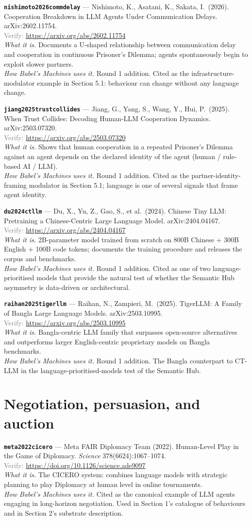 \documentclass[11pt,a4paper]{article}
\newcommand{\entry}[5]{%
  \par\smallskip
  \noindent\textbf{\texttt{#1}} --- #2\\
  {\footnotesize \textcolor{gray}{Verify:} \url{#3}}\\
  \textit{What it is.} #4\\
  \textit{How Babel's Machines uses it.} #5
  \par\medskip
}
\begin{document}
\entry{nishimoto2026commdelay}
{Nishimoto, K., Asatani, K., Sakata, I.\ (2026). Cooperation Breakdown in LLM Agents Under Communication Delays. arXiv:2602.11754.}
{https://arxiv.org/abs/2602.11754}
{Documents a U-shaped relationship between communication delay and cooperation in continuous Prisoner's Dilemma; agents spontaneously begin to exploit slower partners.}
{Round 1 addition. Cited as the infrastructure-modulator example in Section 5.1: behaviour can change without any language change.}

\entry{jiang2025trustcollides}
{Jiang, G., Yang, S., Wang, Y., Hui, P.\ (2025). When Trust Collides: Decoding Human-LLM Cooperation Dynamics. arXiv:2503.07320.}
{https://arxiv.org/abs/2503.07320}
{Shows that human cooperation in a repeated Prisoner's Dilemma against an agent depends on the declared identity of the agent (human / rule-based AI / LLM).}
{Round 1 addition. Cited as the partner-identity-framing modulator in Section 5.1; language is one of several signals that frame agent identity.}

\entry{du2024ctllm}
{Du, X., Yu, Z., Gao, S., et al.\ (2024). Chinese Tiny LLM: Pretraining a Chinese-Centric Large Language Model. arXiv:2404.04167.}
{https://arxiv.org/abs/2404.04167}
{2B-parameter model trained from scratch on 800B Chinese + 300B English + 100B code tokens; documents the training procedure and releases the corpus and benchmarks.}
{Round 1 addition. Cited as one of two language-prioritised models that provide the natural test of whether the Semantic Hub asymmetry is data-driven or architectural.}

\entry{raihan2025tigerllm}
{Raihan, N., Zampieri, M.\ (2025). TigerLLM: A Family of Bangla Large Language Models. arXiv:2503.10995.}
{https://arxiv.org/abs/2503.10995}
{Bangla-centric LLM family that surpasses open-source alternatives and outperforms larger English-centric proprietary models on Bangla benchmarks.}
{Round 1 addition. The Bangla counterpart to CT-LLM in the language-prioritised-models test of the Semantic Hub.}

\section{Negotiation, persuasion, and auction}

\entry{meta2022cicero}
{Meta FAIR Diplomacy Team (2022). Human-Level Play in the Game of Diplomacy. \emph{Science} 378(6624):1067--1074.}
{https://doi.org/10.1126/science.ade9097}
{The CICERO system: combines language models with strategic planning to play Diplomacy at human level in online tournaments.}
{Cited as the canonical example of LLM agents engaging in long-horizon negotiation. Used in Section 1's catalogue of behaviours and in Section 2's substrate description.}
\end{document}
